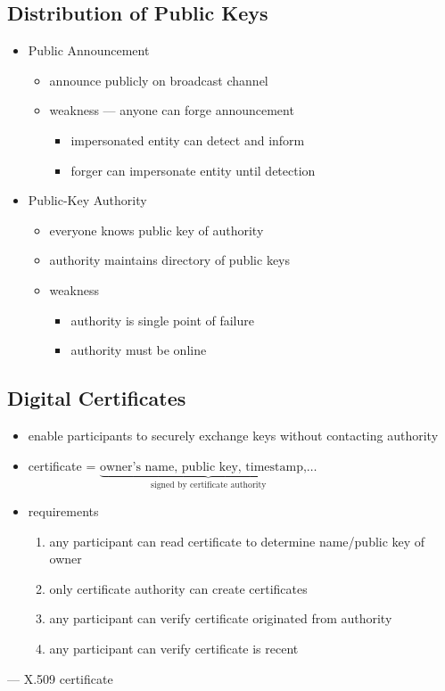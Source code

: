 \documentclass[final]{article}
\begin{document}
\subsection{Distribution of Public Keys}
\begin{itemize}[nosep]
    \item Public Announcement
          \begin{itemize}[nosep]
              \item announce publicly on broadcast channel
              \item weakness --- anyone can forge announcement
                    \begin{itemize}[nosep]
                        \item impersonated entity can detect and inform
                        \item forger can impersonate entity until detection
                    \end{itemize}
          \end{itemize}
    \item Public-Key Authority
          \begin{itemize}[nosep]
              \item everyone knows public key of authority
              \item authority maintains directory of public keys
              \item weakness
                    \begin{itemize}[nosep]
                        \item authority is single point of failure
                        \item authority must be online
                    \end{itemize}
          \end{itemize}
\end{itemize}
\subsection{Digital Certificates}
\begin{itemize}[nosep]
    \item enable participants to securely exchange keys without contacting authority
    \item certificate = $\underbrace{\text{owner's name, public key, timestamp,}\dots}_{\text{signed by certificate authority}}$
    \item requirements
          \begin{enumerate}[nosep]
              \item any participant can read certificate to determine name/public key of owner
              \item only certificate authority can create certificates
              \item any participant can verify certificate originated from authority
              \item any participant can verify certificate is recent
          \end{enumerate}
\end{itemize}
 --- \glsdesc{X.509 certificate}
\end{document}
